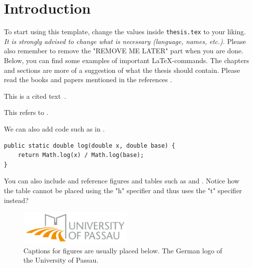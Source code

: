 

\chapter{Introduction}
\label{chapter:introduction}

To start using this template, change the values inside \texttt{thesis.tex} to your liking. \emph{It is strongly advised to change what is necessary (language, names, etc.).} Please also remember to remove the "REMOVE ME LATER" part when you are done. Below, you can find some examples of important \LaTeX-commands. The chapters and sections are more of a suggestion of what the thesis should contain. Please read the books and papers mentioned in the references \cite{DBLP:books/sp/GrubaZ17, DBLP:books/sp/EvansGZ14, DBLP:books/sp/Zobel14, DBLP:conf/cikm/Zobel15, DBLP:conf/icse-seeng/MauererKS22}.

This is a cited text~\cite{DBLP:books/sp/Zobel14}.


This refers to .

We can also add code such as in .

\begin{code}
    \label{lst:log}
    \begin{verbatim}
public static double log(double x, double base) {
    return Math.log(x) / Math.log(base);
}
    \end{verbatim}
\end{code}

You can also include and reference figures and tables such as  and . Notice how the table cannot be placed using the "h" specifier and thus uses the "t" specifier instead?

\begin{figure}[ht!]
    \centering
    \includegraphics[width=0.5\textwidth]{img/logouni_en.png}
    \caption{Captions for figures are usually placed below. The German logo of the University of Passau.}
    \label{fig:test}
\end{figure}

